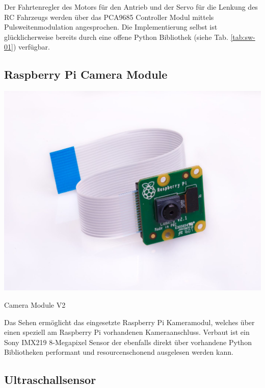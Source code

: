     \noindent
    Der Fahrtenregler des Motors für den Antrieb und der Servo für die Lenkung
    des RC Fahrzeugs werden über das PCA9685 Controller Modul mittels
    Pulsweitenmodulation angesprochen. Die Implementierung selbst ist
    glücklicherweise bereits durch eine offene Python Bibliothek (siehe Tab.
    \ref{tab:sw-01}) verfügbar. 
  
  \subsection{Raspberry Pi Camera Module}
    \begin{minipage}{\columnwidth}
      \makeatletter
      \def\@captype{figure}
      \makeatother
      \centering
      \includegraphics[width=0.6\linewidth]{images/hw_picam.jpg}
      \caption{Camera Module V2}
      \label{fig:img-hw-03}
    \end{minipage}
    \vspace{1cm}

    \noindent
    Das Sehen ermöglicht das eingesetzte Raspberry Pi Kameramodul, welches über
    einen speziell am Raspberry Pi vorhandenen Kameraanschluss. Verbaut ist
    ein Sony IMX219 8-Megapixel Sensor der ebenfalls direkt über vorhandene
    Python Bibliotheken performant und resourcenschonend ausgelesen werden kann.

  \subsection{Ultraschallsensor}

